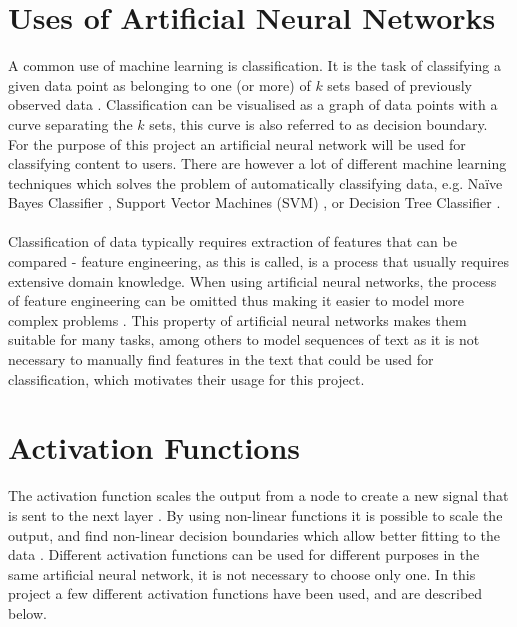 \section{Uses of Artificial Neural Networks}
A common use of machine learning is classification. It is the task of classifying a given data point as belonging to one (or more) of $k$ sets based of previously observed data \parencite{Michie94machinelearning}. Classification can be visualised as a graph of data points with a curve separating the $k$ sets, this curve is also referred to as decision boundary. For the purpose of this project an artificial neural network will be used for classifying content to users. There are however a lot of different machine learning techniques which solves the problem of automatically classifying data, e.g. Naïve Bayes Classifier \parencite{rish2001empirical}, Support Vector Machines (SVM) \parencite{boser1992training, cortes1995support}, or Decision Tree Classifier \parencite{safavian1991survey}.
\\\\
Classification of data typically requires extraction of features that can be compared - feature engineering, as this is called, is a process that usually requires extensive domain knowledge. When using artificial neural networks, the process of feature engineering can be omitted  thus making it easier to model more complex problems \parencite{nlp2011ronan, lecun2015deep}. This property of artificial neural networks makes them suitable for many tasks, among others to model sequences of text as it is not necessary to manually find features in the text that could be used for classification, which motivates their usage for this project.


\section{Activation Functions}\label{activationfunction}
The activation function scales the output from a node to create a new signal that is sent to the next layer \parencite{basheer2000artificial}. By using non-linear functions it is possible to scale the output, and find non-linear decision boundaries which allow better fitting to the data \parencite{lippmann1987introduction, basheer2000artificial}. Different activation functions can be used for different purposes in the same artificial neural network, it is not necessary to choose only one. In this project a few different activation functions have been used, and are described below.

